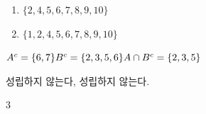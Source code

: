 \documentclass{oblivoir}
\begin{document}
\begin{multicols*}{2}
%
\begin{enumerate}
\item
\(\{2,4,5,6,7,8,9,10\}\)
\item
\(\{1,2,4,5,6,7,8,9,10\}\)
\end{enumerate}

%

%
\(
A^c=\{6,7\}\\
B^c=\{2,3,5,6\}\\
A\cap B^c=\{2,3,5\}
\)


%

%

%

%
성립하지 않는다, 성립하지 않는다.


%

%
3

%

\end{multicols*}


\end{document}
